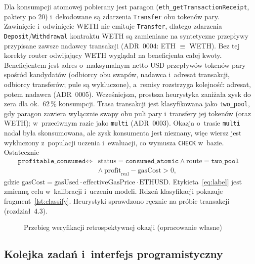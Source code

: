 Dla konsumpcji atomowej pobierany jest paragon (\texttt{eth\_getTransactionReceipt}, pakiety po 20)
i~dekodowane są zdarzenia \texttt{Transfer} obu tokenów pary. Zawinięcie i~odwinięcie WETH nie
emituje \texttt{Transfer}, dlatego zdarzenia \texttt{Deposit}/\texttt{Withdrawal} kontraktu WETH są
zamieniane na syntetyczne przepływy przypisane zawsze nadawcy transakcji (ADR~0004: ETH
$\equiv$ WETH). Bez tej korekty router odwijający WETH wyglądał na beneficjenta całej kwoty.
Beneficjentem jest adres o~maksymalnym netto USD przepływów tokenów pary spośród kandydatów
(odbiorcy obu swapów, nadawca i~adresat transakcji, odbiorcy transferów; pule są wykluczone),
a~remisy rozstrzyga kolejność: adresat, potem nadawca (ADR~0005). Wcześniejsza, prostsza
heurystyka zaniżała zysk do zera dla ok.~62\,\% konsumpcji. Trasa transakcji jest klasyfikowana
jako \texttt{two\_pool}, gdy paragon zawiera wyłącznie swapy obu puli pary i~transfery jej tokenów
(oraz WETH); w~przeciwnym razie jako \texttt{multi} (ADR~0003). Okazja o~trasie \texttt{multi}
nadal była skonsumowana, ale zysk konsumenta jest nieznany, więc wiersz jest wykluczony
z~populacji uczenia i~ewaluacji, co wymusza \texttt{CHECK} w~bazie. Ostatecznie
\begin{equation}
  \begin{split}
  \texttt{profitable\_consumed} \Leftrightarrow{}&
  \text{status}=\texttt{consumed\_atomic} \wedge \text{route}=\texttt{two\_pool}\\
  &\wedge\ \mathrm{profit}_{\mathrm{real}} - \mathrm{gasCost} > 0,
  \end{split}
  \label{eq:label}
\end{equation}
gdzie $\mathrm{gasCost} = \mathrm{gasUsed}\cdot\mathrm{effectiveGasPrice}\cdot\mathrm{ETHUSD}$.
Etykieta~\eqref{eq:label} jest zmienną celu w~kalibracji i~uczeniu modeli. Rdzeń klasyfikacji pokazuje fragment~\ref{lst:classify}. Heurystyki sprawdzono ręcznie na próbie
transakcji (rozdział~4.3).



\begin{figure}[H]\centering\resizebox{\linewidth}{!}{}
\caption{Przebieg weryfikacji retrospektywnej okazji (opracowanie własne)}\label{fig:verify}\end{figure}

\subsection{Kolejka zadań i~interfejs programistyczny}

